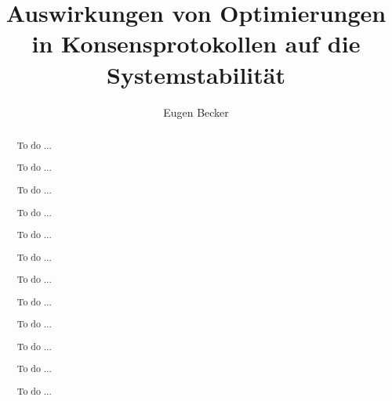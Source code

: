 \documentclass[nonacm,sigconf,natbib=false]{acmart}
\begin{document}
\title{Auswirkungen von Optimierungen in Konsensprotokollen auf die Systemstabilität} %

\author{Eugen Becker}

\renewcommand{\shortauthors}{Eugen Becker}

\renewcommand{\abstractname}{Kurzfassung}

\renewcommand{\refname}{Literaturverzeichnis}

\begin{abstract}
  To do ...

  To do ...

  To do ...

  To do ...

  To do ...

  To do ...

  To do ...

  To do ...

  To do ...

  To do ...

  To do ...

  To do ...
\end{abstract}


\maketitle
\end{document}
